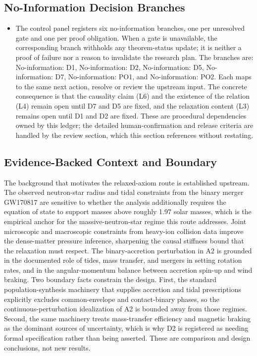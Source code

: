 \documentclass[conference]{IEEEtran}
\begin{document}
\subsection{No-Information Decision Branches}
\begin{itemize}
\item The control panel registers six no-information branches, one per unresolved gate and one per proof obligation. When a gate is unavailable, the corresponding branch withholds any theorem-status update; it is neither a proof of failure nor a reason to invalidate the research plan. The branches are: No-information: D1, No-information: D2, No-information: D5, No-information: D7, No-information: PO1, and No-information: PO2. Each maps to the same next action, resolve or review the upstream input. The concrete consequence is that the causality claim (L6) and the existence of the relation (L4) remain open until D7 and D5 are fixed, and the relaxation content (L3) remains open until D1 and D2 are fixed. These are procedural dependencies owned by this ledger; the detailed human-confirmation and release criteria are handled by the review section, which this section references without restating.
\end{itemize}

\subsection{Evidence-Backed Context and Boundary}
The background that motivates the relaxed-axiom route is established upstream. The observed neutron-star radius and tidal constraints from the binary merger GW170817 are sensitive to whether the analysis additionally requires the equation of state to support masses above roughly 1.97 solar masses, which is the empirical anchor for the massive-neutron-star regime this route addresses. Joint microscopic and macroscopic constraints from heavy-ion collision data improve the dense-matter pressure inference, sharpening the causal stiffness bound that the relaxation must respect. The binary-accretion perturbation in A2 is grounded in the documented role of tides, mass transfer, and mergers in setting rotation rates, and in the angular-momentum balance between accretion spin-up and wind braking. Two boundary facts constrain the design. First, the standard population-synthesis machinery that supplies accretion and tidal prescriptions explicitly excludes common-envelope and contact-binary phases, so the continuous-perturbation idealization of A2 is bounded away from those regimes. Second, the same machinery treats mass-transfer efficiency and magnetic braking as the dominant sources of uncertainty, which is why D2 is registered as needing formal specification rather than being asserted. These are comparison and design conclusions, not new results.~\cite{cite_1e5d552669fc0c56,cite_2908f4a456e2afd6,cite_42e341ff6471ce89,cite_6c11517977d0b39d,cite_c369df652181e8f7}
\end{document}
